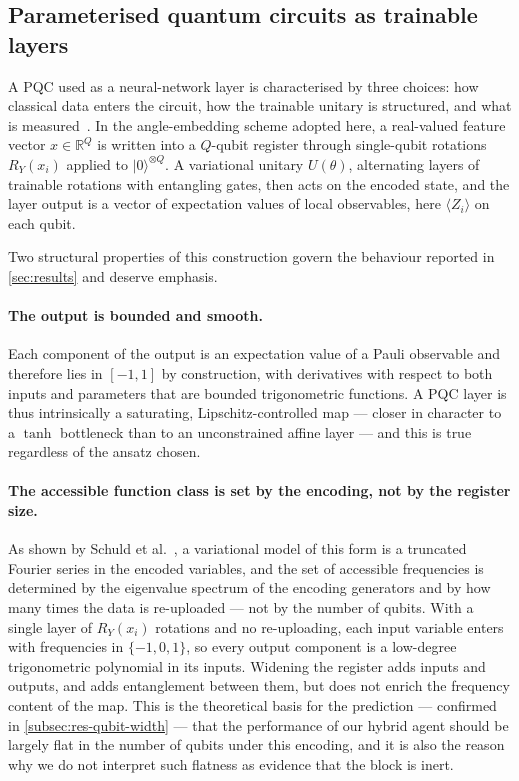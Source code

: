 \documentclass[aps,floatfix,superscriptaddress,twocolumn,tightenlines,amsmath,amssymb,nofootinbib,10pt,longbibliography,prl]{revtex4-2}
\begin{document}
\subsection{Parameterised quantum circuits as trainable layers}
\label{subsec:bg-pqc}

A PQC used as a neural-network layer is characterised by three choices: how
classical data enters the circuit, how the trainable unitary is structured, and
what is measured~\cite{benedetti2019,cerezo2021}. In the angle-embedding scheme
adopted here, a real-valued feature vector $x \in \mathbb{R}^{Q}$ is written
into a $Q$-qubit register through single-qubit rotations $R_Y(x_i)$ applied to
$\lvert 0 \rangle^{\otimes Q}$. A variational unitary $U(\theta)$, alternating
layers of trainable rotations with entangling gates, then acts on the encoded
state, and the layer output is a vector of expectation values of local
observables, here $\langle Z_i \rangle$ on each qubit.

Two structural properties of this construction govern the behaviour reported in
\ref{sec:results} and deserve emphasis.

\paragraph{The output is bounded and smooth.}
Each component of the output is an expectation value of a Pauli observable and
therefore lies in $[-1,1]$ by construction, with derivatives with respect to
both inputs and parameters that are bounded trigonometric functions. A PQC
layer is thus intrinsically a saturating, Lipschitz-controlled map --- closer in
character to a $\tanh$ bottleneck than to an unconstrained affine layer --- and
this is true regardless of the ansatz chosen.

\paragraph{The accessible function class is set by the encoding, not by the
register size.}
As shown by Schuld et al.~\cite{schuld2021encoding}, a variational model of this
form is a truncated Fourier series in the encoded variables, and the set of
accessible frequencies is determined by the eigenvalue spectrum of the encoding
generators and by how many times the data is re-uploaded --- not by the number
of qubits. With a single layer of $R_Y(x_i)$ rotations and no re-uploading, each
input variable enters with frequencies in $\{-1,0,1\}$, so every output
component is a low-degree trigonometric polynomial in its inputs. Widening the
register adds inputs and outputs, and adds entanglement between them, but does
not enrich the frequency content of the map. This is the theoretical basis for
the prediction --- confirmed in \ref{subsec:res-qubit-width} --- that the
performance of our hybrid agent should be largely flat in the number of qubits
under this encoding, and it is also the reason why we do not interpret such
flatness as evidence that the block is inert.
\end{document}
